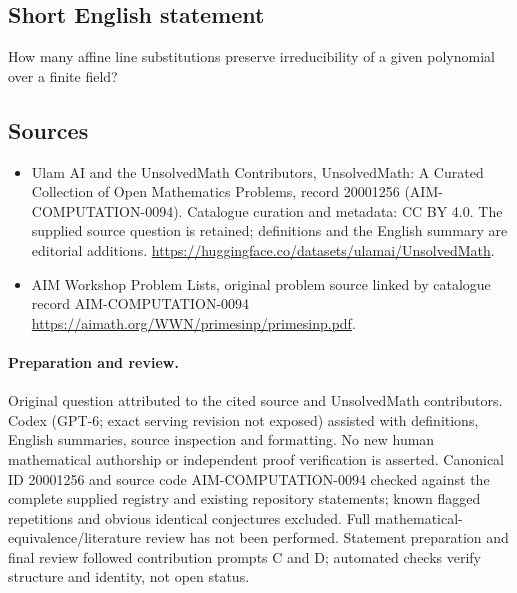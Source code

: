 \documentclass[11pt]{article}
\begin{document}
\subsection{Short English statement}
How many affine line substitutions preserve irreducibility of a given polynomial over a finite field?
\subsection{Sources}
\begin{itemize}
\item[\hypertarget{source:20001256:1}{S1}] Ulam AI and the UnsolvedMath Contributors, UnsolvedMath: A Curated Collection of Open Mathematics Problems, record 20001256 (AIM-COMPUTATION-0094). Catalogue curation and metadata: CC BY 4.0. The supplied source question is retained; definitions and the English summary are editorial additions.
\url{https://huggingface.co/datasets/ulamai/UnsolvedMath}.
\item[\hypertarget{source:20001256:2}{S2}] AIM Workshop Problem Lists, original problem source linked by catalogue record AIM-COMPUTATION-0094
\url{https://aimath.org/WWN/primesinp/primesinp.pdf}.
\end{itemize}
\paragraph{Preparation and review.}
Original question attributed to the cited source and UnsolvedMath contributors. Codex (GPT-6; exact serving revision not exposed) assisted with definitions, English summaries, source inspection and formatting. No new human mathematical authorship or independent proof verification is asserted. Canonical ID 20001256 and source code AIM-COMPUTATION-0094 checked against the complete supplied registry and existing repository statements; known flagged repetitions and obvious identical conjectures excluded. Full mathematical-equivalence/literature review has not been performed. Statement preparation and final review followed contribution prompts C and D; automated checks verify structure and identity, not open status.
\label{end:20001256}
\end{document}
